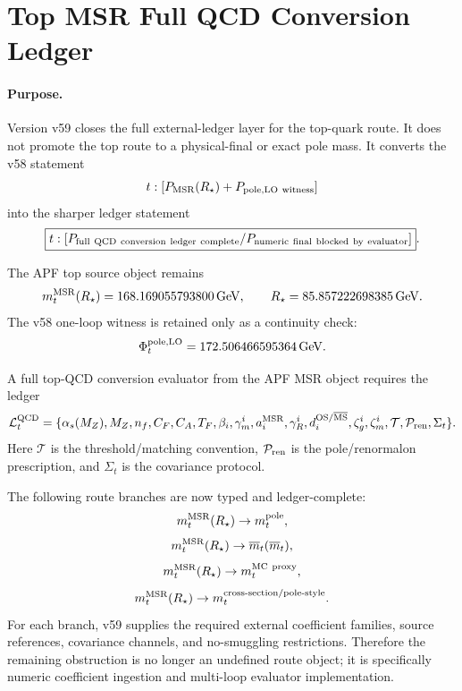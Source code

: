 \section{Top MSR Full QCD Conversion Ledger}
\label{sec:top-msr-full-qcd-conversion-ledger-v59}

\paragraph{Purpose.}
Version v59 closes the full external-ledger layer for the top-quark route.  It does
not promote the top route to a physical-final or exact pole mass.  It converts the
v58 statement
\[
 t:[P_{\rm MSR}(R_\star)+P_{\rm pole,LO\ witness}]
\]
into the sharper ledger statement
\[
 \boxed{t:[P_{\rm full\ QCD\ conversion\ ledger\ complete}/
 P_{\rm numeric\ final\ blocked\ by\ evaluator}]}.
\]

\begin{definition}
The APF top source object remains
\[
 m_t^{\rm MSR}(R_\star)=168.169055793800\,{\rm GeV},\qquad
 R_\star=85.857222698385\,{\rm GeV}.
\]
The v58 one-loop witness is retained only as a continuity check:
\[
 \Phi_t^{\rm pole,LO}=172.506466595364\,{\rm GeV}.
\]
\end{definition}

\begin{definition}
A full top-QCD conversion evaluator from the APF MSR object requires the ledger
\[
\mathcal L_t^{\rm QCD}=\{
\alpha_s(M_Z),M_Z,n_f,C_F,C_A,T_F,\beta_i,\gamma_m^i,
 a_i^{\rm MSR},\gamma_R^i,d_i^{{\rm OS}/\overline{\rm MS}},
 \zeta_g^i,\zeta_m^i,\mathcal T,\mathcal P_{\rm ren},\Sigma_t\}.
\]
Here \(\mathcal T\) is the threshold/matching convention,
\(\mathcal P_{\rm ren}\) is the pole/renormalon prescription, and \(\Sigma_t\)
is the covariance protocol.
\end{definition}

\begin{theorem}
The following route branches are now typed and ledger-complete:
\[
 m_t^{\rm MSR}(R_\star)\to m_t^{\rm pole},
\]
\[
 m_t^{\rm MSR}(R_\star)\to \overline m_t(\overline m_t),
\]
\[
 m_t^{\rm MSR}(R_\star)\to m_t^{\rm MC\ proxy},
\]
\[
 m_t^{\rm MSR}(R_\star)\to m_t^{\rm cross\text{-}section/pole\text{-}style}.
\]
For each branch, v59 supplies the required external coefficient families, source
references, covariance channels, and no-smuggling restrictions.  Therefore the
remaining obstruction is no longer an undefined route object; it is specifically
numeric coefficient ingestion and multi-loop evaluator implementation.
\end{theorem}


